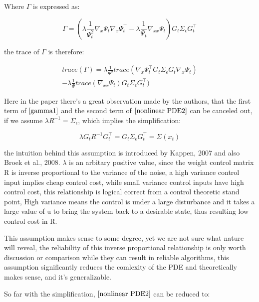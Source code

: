 \documentclass[journal]{IEEEtran}
\begin{document}
Where $\Gamma$ is expressed as:

\begin{equation}
  \Gamma = (\lambda\frac{1}{\Psi_t^2}\nabla_x \Psi_t\nabla_x \Psi_t^{\top} - \lambda \frac{1}{\Psi_t} \nabla_{xx}\Psi_t)G_t\Sigma_{\epsilon} G_t^{\top} \nonumber
\end{equation}

the trace of $\Gamma $ is therefore:

\begin{equation}
  \begin{aligned}
  trace(\Gamma) = \lambda \frac{1}{\Psi^2}trace(\nabla_x\Psi_t^{\top} G_t \Sigma_{\epsilon} G_t \nabla_x\Psi_t) \\ - \lambda \frac{1}{\Psi}trace(\nabla_{xx}\Psi_t)G_t\Sigma_{\epsilon} G_t^{\top})
   \label{gamma1}  
\end{aligned}
\end{equation}

Here in the paper there's a great observation made by the authors, that the first term of $\ref{gamma1}$ and the second term of $\ref{nonlinear PDE2}$ can be canceled out,
if we assume $\lambda R^{-1} = \Sigma_{\epsilon}$, which implies the simplification:

\begin{equation}
  \lambda G_t R^{-1}G_t^{\top} = G_t \Sigma_{\epsilon}G_t^{\top} = \Sigma(x_t)
  \label{assumption1}
\end{equation}

the intuition behind this assumption is introduced by Kappen, 2007 and also Broek et al., 2008. $\lambda $ is an arbitary positive value, since the weight control matrix R is inverse proportional to the variance of the noise, 
a high variance control input implies cheap control cost, while small variance control inputs have high control cost, this relationship is logical correct from a control theoretic stand point,
High variance means the control is under a large disturbance and it takes a large value of u to bring the system back to a desirable state, thus resulting low control cost in R.

This assumption makes sense to some degree, yet we are not sure what nature will reveal, the reliability of this inverse proportional relationship is only worth discussion or comparison while they can
result in reliable algorithms, this assumption significantly reduces the comlexity of the PDE and theoretically makes sense, and it's generalizable. 

So far with the simplification, $\ref{nonlinear PDE2}$ can be reduced to:
\end{document}
